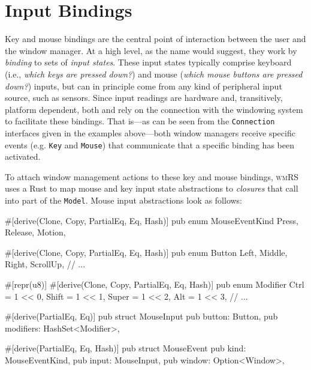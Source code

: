 \section{Input Bindings}\label{inputbindings}

Key and mouse bindings are the central point of interaction between the user and
the window manager. At a high level, as the name would suggest, they work by
\textit{binding} to sets of \textit{input states}. These input states typically
comprise keyboard (i.e., \textit{which keys are pressed down?}) and mouse
(\textit{which mouse buttons are pressed down?}) inputs, but can in principle
come from any kind of peripheral input source, such as sensors. Since input
readings are hardware and, transitively, platform dependent, both \wmrs and
\wmcpp rely on the connection with the windowing system to facilitate these
bindings. That is---as can be seen from the \texttt{Connection} interfaces given
in the examples above---both window managers receive specific events (e.g.
\texttt{Key} and \texttt{Mouse}) that communicate that a specific binding has
been activated.


To attach window management actions to these key and mouse bindings,
\textsc{wmRS} uses a Rust  to map mouse and key input state
abstractions to \textit{closures} that call into part of the \texttt{Model}.
Mouse input abstractions look as follows:

\begin{rustblock}
  #[derive(Clone, Copy, PartialEq, Eq, Hash)]
  pub enum MouseEventKind {
    Press, Release, Motion,
  }
\end{rustblock}
\begin{rustblock}
  #[derive(Clone, Copy, PartialEq, Eq, Hash)]
  pub enum Button {
    Left, Middle, Right, ScrollUp, // ...
  }
\end{rustblock}
\begin{rustblock}
  #[repr(u8)]
  #[derive(Clone, Copy, PartialEq, Eq, Hash)]
  pub enum Modifier {
    Ctrl = 1 << 0, Shift = 1 << 1,
    Super = 1 << 2, Alt = 1 << 3, // ...
  }
\end{rustblock}
\begin{rustblock}
  #[derive(PartialEq, Eq)]
  pub struct MouseInput {
    pub button: Button,
    pub modifiers: HashSet<Modifier>,
  }
\end{rustblock}
\begin{rustblock}
  #[derive(PartialEq, Eq, Hash)]
  pub struct MouseEvent {
    pub kind: MouseEventKind,
    pub input: MouseInput,
    pub window: Option<Window>,
  }
\end{rustblock}

